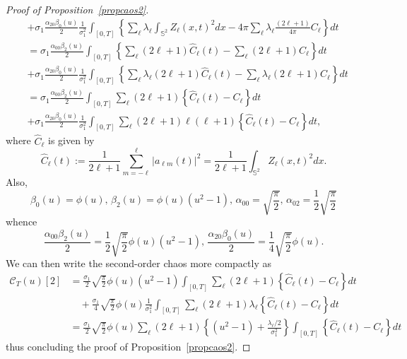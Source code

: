 \documentclass[10pt]{amsart}
\theoremstyle{definition}\newtheorem{defi}[theo]{Definition}\newtheorem{rema}[theo]{Remark}\newtheorem{exam}[theo]{Example}\newtheorem{exem}[theo]{Example}\newtheorem{nota}[theo]{Notation}
\newcommand{\clC}{\mathcal{C}}
\newcommand{\bbS}{\mathbb{S}}
\begin{document}
\begin{proof}[{Proof of Proposition~\ref{propcaos2}}]
\begin{align*}
&+\sigma_1 \frac{\alpha _{20}\beta _{0}(u)}{2}\frac{1}{\sigma_1^2}
\int_{[0,T]}\left\{\sum_{\ell }\lambda _{\ell }\int_{\bbS^{2}}Z_{\ell }(x,t)^2 dx-4\pi \sum_{\ell } \lambda _{\ell } \frac{(2\ell +1)}{4\pi }C_{\ell } \right\} dt\\
&=\sigma_1 \frac{\alpha _{00}\beta _{2}(u)}{2}\int_{[0,T]}\left\{ \sum_{\ell}(2\ell+1)\widehat{C}_{\ell }(t)-\sum_{\ell}(2\ell +1)C_{\ell}\right\} dt
\\
&+\sigma_1 \frac{\alpha _{20}\beta _{0}(u)}{2}\frac{1}{\sigma_1^2}
\int_{[0,T]}\left\{ \sum_{\ell }\lambda _{\ell }(2\ell+1)\widehat{C}_{\ell }(t)- \sum_{\ell} \lambda _{\ell} (2\ell +1)C_{\ell} \right\} dt \\
&=\sigma_1 \frac{\alpha _{00}\beta _{2}(u)}{2}\int_{[0,T]}\sum_{\ell}(2\ell +1)\left\{ \widehat{C}_{\ell }(t)-C_\ell\right\} dt \\
&+\sigma_1 \frac{\alpha _{20}\beta _{0}(u)}{2}\frac{1}{\sigma_1^2}
\int_{[0,T]}\sum_{\ell }(2\ell +1)\ell (\ell +1)\left\{\widehat{C}_{\ell }(t)-C_\ell\right\}dt,
\end{align*}
\endgroup
where $\widehat{C}_{\ell }$ is given by
\begin{equation}\label{sampletris}
\widehat{C}_{\ell }(t):=\frac{1}{2\ell +1}\sum_{m=-\ell }^{\ell }\left\vert a_{\ell m}(t)\right\vert^{2}=\frac{1}{2\ell +1}\int_{\bbS^{2}}Z_{\ell}(x,t)^{2}dx\text{.}
\end{equation}
Also,
\begin{equation*}
\beta _{0}(u)=\phi (u)\text{, }\beta _{2}(u)=\phi (u)\left(u^{2}-1\right)\text{, }
\alpha _{00}=\sqrt{\frac{\pi }{2}}\text{, }\alpha _{02}=\frac{1}{2}\sqrt{
\frac{\pi }{2}}
\end{equation*}
whence
\begin{equation*}
\frac{\alpha _{00}\beta _{2}(u)}{2}=\frac{1}{2}\sqrt{\frac{\pi }{2}}\phi (u)\left(u^{2}-1\right)\text{, }\frac{\alpha _{20}\beta _{0}(u)}{2}=\frac{1}{4}\sqrt{
\frac{\pi }{2}}\phi (u)\text{.}
\end{equation*}
We can then write the second-order chaos more compactly as
\begin{align*}
\clC_T(u)[2] &= \frac{\sigma _{1}}{2}\sqrt{\frac{\pi }{2}}\phi (u)\left(u^{2}-1\right)\int_{[0,T]}\sum_{\ell }(2\ell +1)\left\{ \widehat{C}_{\ell }(t)-C_{\ell }\right\} dt \\
&\quad+\frac{\sigma _{1}}{4}\sqrt{\frac{\pi }{2}}\phi (u)\frac{1}{\sigma _{1}^{2} }\int_{[0,T]}\sum_{\ell }(2\ell +1)\lambda _{\ell }\left\{ \widehat{C}_{\ell }(t)-C_{\ell }\right\} dt \\
&= \frac{\sigma _{1}}{2}\sqrt{\frac{\pi }{2}}\phi (u)\sum_{\ell }(2\ell +1)\left\{\left(u^{2}-1\right)+\frac{\lambda _{\ell }/2}{\sigma _{1}^{2}}\right\}
\int_{[0,T]} \left\{\widehat{C}_{\ell }(t)-C_{\ell }\right\} dt
\end{align*}
thus concluding the proof of Proposition~\ref{propcaos2}.
\end{proof}
\end{document}
